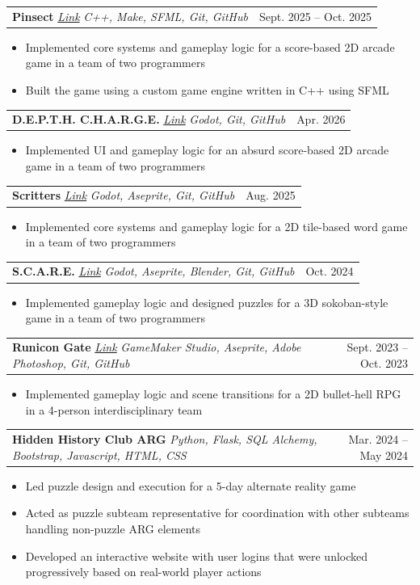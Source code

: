 \documentclass[letterpaper,11pt]{article}
\makeatletter
\newcommand{\smallpipe}{\textbf{\raisebox{0.2ex}{\scalebox{1}[0.8]{\textbar}}}}
\newcommand{\resumeItem}[1]{
	\item\small{{#1 \vspace{-2pt}}}
}
\newcommand{\resumeProjectHeading}[3]{
	\item
		\begin{tabular*}{0.97\textwidth}{l@{\extracolsep{\fill}}r}
		\textbf{#1} \smallpipe{} \textit{\small#2} & #3 \\
		\end{tabular*}\vspace{-7pt}
}
\newcommand{\resumeProjectHeadingWebsite}[4]{
	\item
		\begin{tabular*}{0.97\textwidth}{l@{\extracolsep{\fill}}r}
		\textbf{#1} \smallpipe{} \textit{\href{#2}{Link}} \smallpipe{} \textit{\small#3} & #4 \\
		\end{tabular*}\vspace{-7pt}
}
\newcommand{\resumeItemListStart}{\begin{itemize}}
\newcommand{\resumeItemListEnd}{\end{itemize}\vspace{-5pt}}
\makeatother
\begin{document}
	\resumeProjectHeadingWebsite
	{Pinsect}
	{https://qksjeli.itch.io/pinsect}
	{C++, Make, SFML, Git, GitHub}
	{Sept. 2025 -- Oct. 2025}
	\resumeItemListStart
		\resumeItem{Implemented core systems and gameplay logic for a score-based 2D arcade game in a team of two programmers}
		\resumeItem{Built the game using a custom game engine written in C++ using SFML}
	\resumeItemListEnd

	\resumeProjectHeadingWebsite
	{D.E.P.T.H. C.H.A.R.G.E.}
	{https://codazen.itch.io/depth-charge}
	{Godot, Git, GitHub}
	{Apr. 2026}
	\resumeItemListStart
		\resumeItem{Implemented UI and gameplay logic for an absurd score-based 2D arcade game in a team of two programmers}
	\resumeItemListEnd

	\resumeProjectHeadingWebsite
	{Scritters}
	{https://codazen.itch.io/scritters}
	{Godot, Aseprite, Git, GitHub}
	{Aug. 2025}
	\resumeItemListStart
		\resumeItem{Implemented core systems and gameplay logic for a 2D tile-based word game in a team of two programmers}
	\resumeItemListEnd

	\resumeProjectHeadingWebsite
	{S.C.A.R.E.}
	{https://baguettery.itch.io/scare}
	{Godot, Aseprite, Blender, Git, GitHub}
	{Oct. 2024}
	\resumeItemListStart
		\resumeItem{Implemented gameplay logic and designed puzzles for a 3D sokoban-style game in a team of two programmers}
	\resumeItemListEnd

	\resumeProjectHeadingWebsite
	{Runicon Gate}
	{https://codazen.itch.io/runicon-gate}
	{GameMaker Studio, Aseprite, Adobe Photoshop, Git, GitHub}
	{Sept. 2023 -- Oct. 2023}
	\resumeItemListStart
		\resumeItem{Implemented gameplay logic and scene transitions for a 2D bullet-hell RPG in a 4-person interdisciplinary team}
	\resumeItemListEnd

	\resumeProjectHeading
	{Hidden History Club ARG}
	{Python, Flask, SQL Alchemy, Bootstrap, Javascript, HTML, CSS}
	{Mar. 2024 -- May 2024}
	\resumeItemListStart
		\resumeItem{Led puzzle design and execution for a 5-day alternate reality game}
		\resumeItem{Acted as puzzle subteam representative for coordination with other subteams handling non-puzzle ARG elements}
		\resumeItem{Developed an interactive website with user logins that were unlocked progressively based on real-world player actions}
	\resumeItemListEnd
\end{document}
